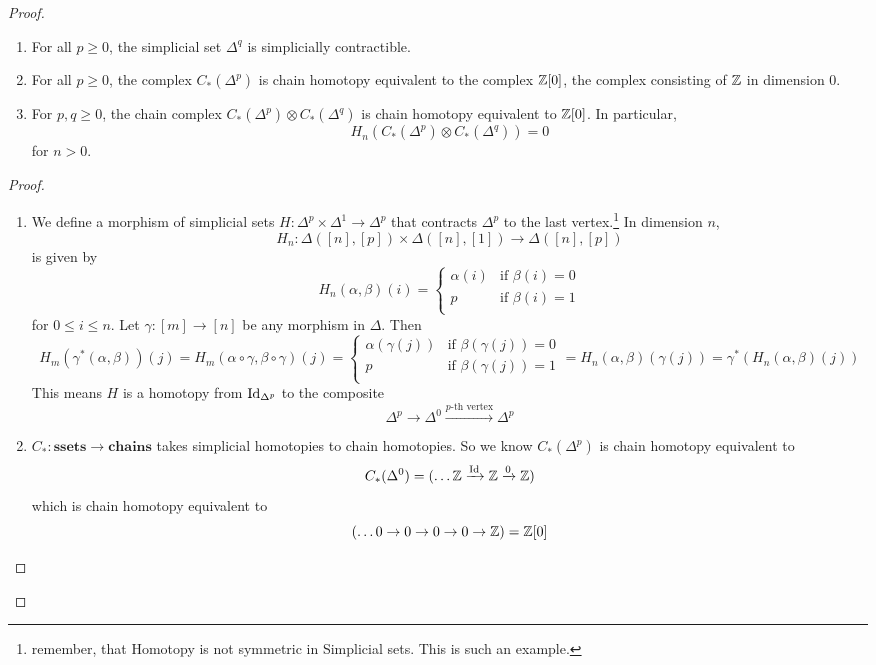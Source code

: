 \documentclass[language=english]{TemplateLecture}
\begin{document}
\begin{proof}
    \begin{proposition}\leavevmode
        \begin{enumerate}
            \item For all \(p\geq 0\), the simplicial set \(\Delta^q\) is simplicially contractible.
            \item For all \(p \geq 0\), the complex \(C_*(\Delta^p)\) is chain homotopy equivalent to the complex \(\mathbb{Z}[0]\), the complex consisting of \(\mathbb{Z}\) in dimension \(0\).
            \item For \(p,q \geq 0\), the chain complex \(C_*(\Delta^p) \otimes C_*(\Delta^q)\) is chain homotopy equivalent to \(\mathbb{Z}[0]\). In particular,
            \[H_n(C_*(\Delta^p) \otimes C_*(\Delta^q)) = 0\]
            for \(n > 0\).
        \end{enumerate}
    \end{proposition}
    \begin{proof}\leavevmode
        \begin{enumerate}
            \item We define a morphism of simplicial sets \(H\colon \Delta^p \times \Delta^1 \to \Delta^p\) that contracts \(\Delta^p\) to the last vertex.\footnote{remember, that Homotopy is not symmetric in Simplicial sets. This is such an example.}
            In dimension \(n\),
            \[H_n\colon \Delta([n], [p]) \times \Delta([n],[1]) \to \Delta([n], [p])\]
            is given by
            \[H_n(\alpha, \beta)(i) = \begin{cases}
                \alpha(i) & \text{if } \beta(i) = 0 \\
                p & \text{if } \beta(i) = 1 \\
            \end{cases}\]
            for \(0 \leq i \leq n\). Let \(\gamma\colon [m] \to [n]\) be any morphism in \(\Delta\). Then
            \[H_m(\gamma^*(\alpha,\beta))(j) = H_m(\alpha\circ \gamma, \beta\circ \gamma)(j) = \begin{cases}
                \alpha(\gamma(j)) & \text{if } \beta(\gamma(j)) = 0 \\
                p & \text{if } \beta(\gamma(j)) = 1 \\
            \end{cases} = H_n(\alpha,\beta)(\gamma(j)) = \gamma^*(H_n(\alpha,\beta)(j))\]
            This means \(H\) is a homotopy from \(\operatorname{Id}_{\Delta^p}\) to the composite
            \[\Delta^p \to \Delta^0 \xrightarrow{p\text{-th vertex}} \Delta^p\]
            \item \(C_*\colon \mathbf{ssets} \to \mathbf{chains}\) takes simplicial homotopies to chain homotopies. So we know \(C_*(\Delta^p)\) is chain homotopy equivalent to
            \[C_*(\Delta^0) = (\dots \mathbb{Z} \xrightarrow{\operatorname{Id}} \mathbb{Z} \xrightarrow{0} \mathbb{Z})\]
            which is chain homotopy equivalent to
            \[(\dots 0 \to 0 \to 0 \to 0 \to \mathbb{Z}) = \mathbb{Z}[0]\]


\end{enumerate}
\end{proof}
\end{proof}
\end{document}
